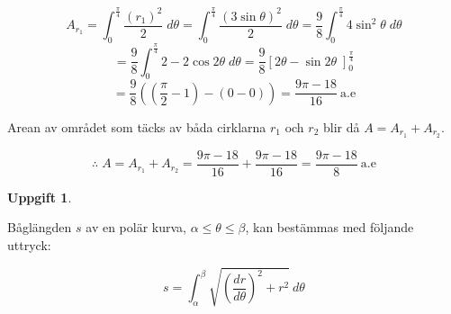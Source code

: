 \documentclass{article}
\newtheorem{thr}{Uppgift}
\begin{document}
\begin{enumerate}
        $$
        A_{r_{1}}
        =
        \int_{0}^{\frac{\pi}{4}} \frac{(r_{1})^2}{2} \; d\theta
        =
        \int_{0}^{\frac{\pi}{4}} \frac{(3\sin\theta)^2}{2} \; d\theta
        =
        \frac{9}{8}
        \int_{0}^{\frac{\pi}{4}} 4\sin^2\theta \; d\theta
        $$
        $$
        =
        \frac{9}{8}
        \int_{0}^{\frac{\pi}{4}} 2-2\cos2\theta \; d\theta
        =
        \frac{9}{8}
        \left[2\theta-\sin2\theta \; \right]_{0}^{\frac{\pi}{4}}
        $$
        $$
        =
        \frac{9}{8}
        ((\frac{\pi}{2}-1)-(0-0))
        =
        \frac{9\pi-18}{16} \: \text{a.e}
        $$

        Arean av området som täcks av båda cirklarna $r_{1}$ och $r_{2}$ blir då $A=A_{r_{1}}+A_{r_{2}}$.

        $$
        \therefore
        \;
        A
        =
        A_{r_{1}}+A_{r_{2}}
        =
        \frac{9\pi-18}{16}+\frac{9\pi-18}{16}
        =
        \frac{9\pi-18}{8} \: \text{a.e}
        $$

\end{enumerate}

\newpage

\begin{thr}
\end{thr}

Båglängden $s$ av en polär kurva, $\alpha\leq\theta\leq\beta$, kan bestämmas med följande uttryck:

$$
s
=
\int_{\alpha}^{\beta} \sqrt{(\frac{dr}{d\theta})^2+r^2} \: d\theta
$$

\vskip 0.5cm
\end{document}
